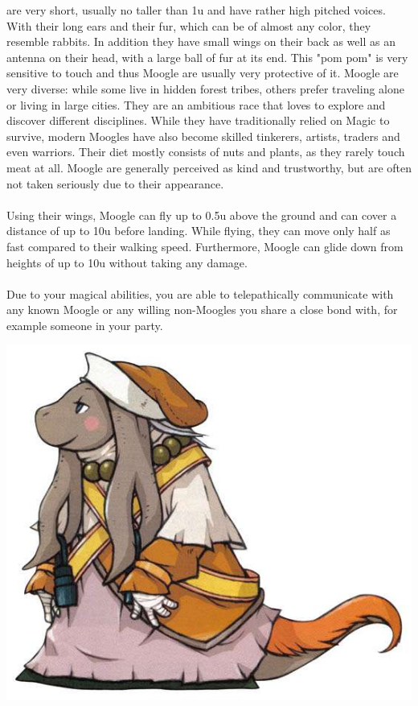 %
 are very short, usually no taller than 1u and have rather high pitched voices.
With their long ears and their fur, which can be of almost any color, they resemble rabbits.
In addition they have small wings on their back as well as an antenna on their head, with a large ball of fur at its end.
This "pom pom" is very sensitive to touch and thus Moogle are usually very protective of it.
Moogle are very diverse: while some live in hidden forest tribes, others prefer traveling alone or living in large cities.
They are an ambitious race that loves to explore and discover different disciplines. 
While they have traditionally relied on Magic to survive, modern Moogles have also become skilled tinkerers, artists, traders and even warriors.
Their diet mostly consists of nuts and plants, as they rarely touch meat at all.
Moogle are generally perceived as kind and trustworthy, but are often not taken seriously due to their appearance.
%
\\\\
%
 Using their wings, Moogle can fly up to 0.5u above the ground and can cover a distance of up to 10u before landing.
While flying, they can move only half as fast compared to their walking speed.
Furthermore, Moogle can glide down from heights of up to 10u without taking any damage.
%
\\\\
%
 Due to your magical abilities, you are able to telepathically communicate with any known Moogle or any willing non-Moogles you share a close bond with, for example someone in your party.
%
\newpage
%
\\
%
\begin{center} \includegraphics[width=\columnwidth]{./art/races/numou.jpg} \end{center}
